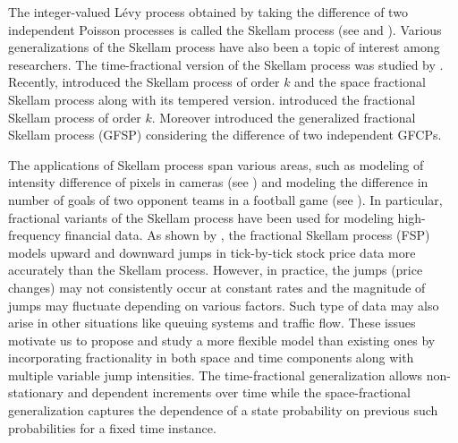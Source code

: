 \documentclass[11pt,oneside,reqno]{amsart}
\theoremstyle{definition}
\theoremstyle{remarkstyle}
\begin{document}
The integer-valued L\'{e}vy process obtained by taking the difference of two independent Poisson processes is called the Skellam process (see \citet{Skellam1946} and \citet{Irwin2018}). Various generalizations of the Skellam process have also been a topic of interest among researchers. The time-fractional version of the Skellam process was studied by \citet{Kerss2014}. Recently, \citet{Gupta2020} introduced the Skellam process of order $k$ and the space fractional Skellam process along with its tempered version. \citet{kataria2024} introduced the fractional Skellam process of order $k$. Moreover \citet{Kataria2022b} introduced the generalized fractional Skellam process (GFSP) considering the difference of two independent GFCPs.  

The applications of Skellam process span various areas, such as modeling of intensity difference of pixels in cameras (see \citet{Hwang2007}) and modeling the difference in number of goals of two opponent teams in a football game (see \citet{Karlis2008}). In particular, fractional variants of the Skellam process have been used for modeling high-frequency financial data. As shown by \citet{Kerss2014}, the fractional Skellam process (FSP) models upward and downward jumps in tick-by-tick stock price data more accurately than the Skellam process. However, in practice, the
jumps (price changes) may not consistently occur at constant rates and the magnitude of jumps  may
fluctuate depending on various factors. Such type of data may also arise in other situations like queuing
systems and traffic flow. These issues motivate us to propose and study a more flexible model than existing ones by incorporating fractionality in both space and time components along with multiple variable jump intensities. The time-fractional generalization allows non-stationary and dependent increments over time while the space-fractional generalization captures the dependence of a state probability on previous such probabilities for a fixed time instance.
\end{document}
